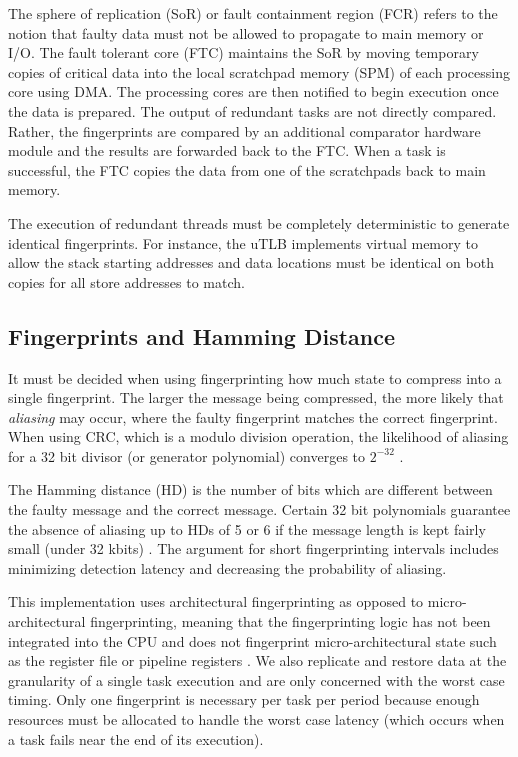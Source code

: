 	The sphere of replication (SoR) or fault containment region (FCR) refers to the notion that faulty data must not be allowed to propagate to main memory or I/O. 
	The fault tolerant core (FTC) maintains the SoR by moving temporary copies of critical data into the local scratchpad memory (SPM) of each processing core using DMA. 
	The processing cores are then notified to begin execution once the data is prepared. 
	The output of redundant tasks are not directly compared.
	Rather, the fingerprints are compared by an additional comparator hardware module and the results are forwarded back to the FTC. 
	When a task is successful, the FTC copies the data from one of the scratchpads back to main memory.
	
	The execution of redundant threads must be completely deterministic to generate identical fingerprints. 
	For instance, the uTLB implements virtual memory to allow the stack starting addresses and data locations must be identical on both copies for all store addresses to match.

\subsection{Fingerprints and Hamming Distance}
\label{s:hd}
	It must be decided when using fingerprinting how much state to compress into a single fingerprint. The larger the message being compressed, the more likely that \emph{aliasing} may occur, where the faulty fingerprint matches the correct fingerprint. 
	When using CRC, which is a modulo division operation, the likelihood of aliasing for a 32 bit divisor (or generator polynomial) converges to $2^{-32}$ \cite{Maxino:09}.
	
	The Hamming distance (HD) is the number of bits which are different between the faulty message and the correct message. 
	Certain 32 bit polynomials guarantee the absence of aliasing up to HDs of 5 or 6 if the message length is kept fairly small (under 32 kbits) \cite{koopman200232}.
	The argument for short fingerprinting intervals includes minimizing detection latency and decreasing the probability of aliasing.

	This implementation uses architectural fingerprinting as opposed to micro-architectural fingerprinting, meaning that the fingerprinting logic has not been integrated into the CPU and does not fingerprint micro-architectural state such as the register file or pipeline registers \cite{jared2007fingerprinting}.
	We also replicate and restore data at the granularity of a single task execution and are only concerned with the worst case timing.
	Only one fingerprint is necessary per task per period because enough resources must be allocated to handle the worst case latency (which occurs when a task fails near the end of its execution). 
		
